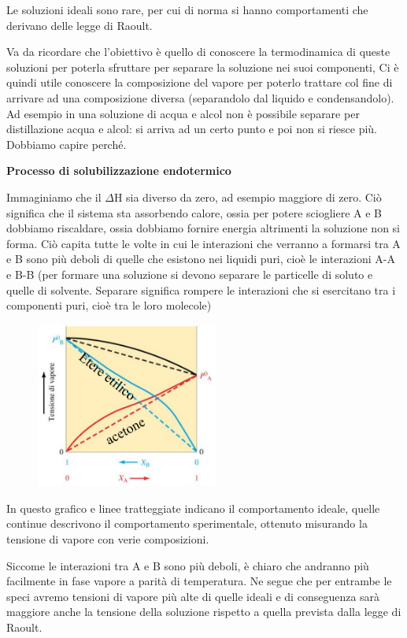 Le soluzioni ideali sono rare, per cui di norma si hanno comportamenti che derivano delle legge di Raoult.

Va da ricordare che l'obiettivo è quello di conoscere la termodinamica di queste soluzioni per poterla sfruttare per separare la soluzione nei suoi componenti, Ci è quindi utile conoscere la composizione del vapore per poterlo trattare col fine di arrivare ad una composizione diversa (separandolo dal liquido e condensandolo). Ad esempio in una soluzione di acqua e alcol non è possibile separare per distillazione acqua e alcol: si arriva ad un certo punto e poi non si riesce più. Dobbiamo capire perché.

\vspace{0.2cm}\textbf{Processo di solubilizzazione endotermico}

Immaginiamo che il $\Delta$H sia diverso da zero, ad esempio maggiore di zero. Ciò significa che il sistema sta assorbendo calore, ossia per potere sciogliere A e B dobbiamo riscaldare, ossia dobbiamo fornire energia altrimenti la soluzione non si forma. Ciò capita tutte le volte in cui le interazioni che verranno a formarsi tra A e B sono più deboli di quelle che esistono nei liquidi puri, cioè le interazioni A-A e B-B (per formare una soluzione si devono separare le particelle di soluto e quelle di solvente. Separare significa rompere le interazioni che si esercitano tra i componenti puri, cioè tra le loro molecole) 

\vspace{-0.3cm}\begin{minipage}{0.4\textwidth}
    \begin{figure}[H]
        \includegraphics[width=6cm]{immagini/tensione_di_vapore_sol_endotermica.png}
    \end{figure}
\end{minipage}
\begin{minipage}{0.6\textwidth}

\vspace{0.4cm}In questo grafico e linee tratteggiate indicano il comportamento ideale, quelle continue descrivono il comportamento sperimentale, ottenuto misurando la tensione di vapore con verie composizioni.

Siccome le interazioni tra A e B sono più deboli, è chiaro che andranno più facilmente in fase vapore a parità di temperatura. Ne segue che per entrambe le speci avremo tensioni di vapore più alte di quelle ideali e di conseguenza sarà maggiore anche la tensione della soluzione rispetto a quella prevista dalla legge di Raoult.
\end{minipage}

